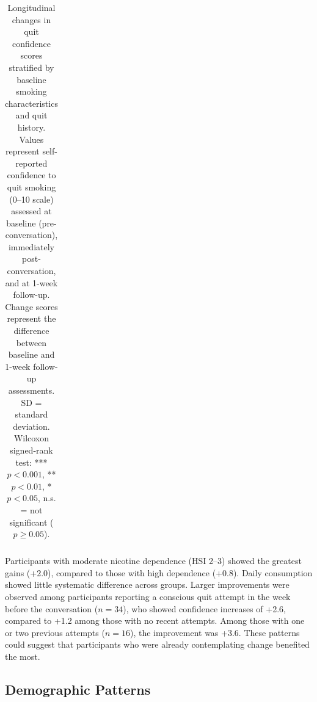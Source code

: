 \begin{table}[ht!]
\begin{tabular*}{\linewidth}{@{\extracolsep{\fill}}lccccc@{}}
    \bottomrule
  \end{tabular*}
  \caption{Longitudinal changes in quit confidence scores stratified by baseline smoking characteristics and quit history. Values represent self-reported confidence to quit smoking (0--10 scale) assessed at baseline (pre-conversation), immediately post-conversation, and at 1-week follow-up. Change scores represent the difference between baseline and 1-week follow-up assessments. SD = standard deviation. Wilcoxon signed-rank test: *** $p < 0.001$, ** $p < 0.01$, * $p < 0.05$, n.s. = not significant ($p \geq 0.05$).}
  \label{tab:hsi_prequit}
\end{table}


Participants with moderate nicotine dependence (HSI 2--3) showed the greatest gains (+2.0), compared to those with high dependence  (+0.8). Daily consumption showed little systematic difference across groups. Larger improvements were observed among participants reporting a conscious quit attempt in the week before the conversation ($n=34$), who showed confidence increases of +2.6, compared to +1.2 among those with no recent attempts. Among those with one or two previous attempts ($n=16$), the improvement was +3.6. These patterns could suggest that participants who were already contemplating change benefited the most.

\subsection{Demographic Patterns}

